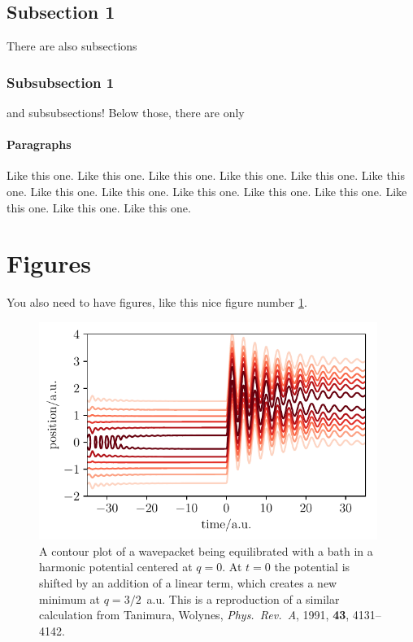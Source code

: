 \documentclass[11pt]{article}
\begin{document}
\subsection{Subsection 1}
There are also subsections
\subsubsection{Subsubsection 1}
and subsubsections! Below those, there are only
\paragraph{Paragraphs} Like this one. Like this one. Like this one. Like this one. Like this one. Like this one. Like this one. Like this one. Like this one. Like this one. Like this one. Like this one. Like this one. Like this one. 
\pagebreak
\section{Figures}
You also need to have figures, like this nice figure number \ref{fig:qheom_contour}.
\begin{figure} [htp!]
	\centering
	\includegraphics [width=11cm]{qheom_contour.pdf}
	\caption{
		A contour plot of a wavepacket being equilibrated with a bath in a harmonic potential centered at $q=0$. At $t=0$ the potential is shifted by an addition of a linear term, which creates a new minimum at $q=3/2$~a.u. This is a reproduction of a similar calculation from Tanimura, Wolynes, \emph{Phys.~Rev.~A}, 1991, \textbf{43}, 4131–4142.
	}
	\label{fig:qheom_contour}
\end{figure}
\end{document}
